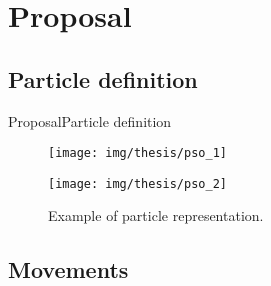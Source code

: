 \documentclass[10pt]{beamer}
\newcommand{\1}{
        	\setbeamertemplate{background}{
        		\texttt{[image: img/1]}
        		\tikz[overlay] \fill[fill opacity=0.75,fill=white] (0,0) rectangle (-\paperwidth,\paperheight);
        	}
}
\begin{document}
\section{Proposal}


\subsection{Particle definition}

\begin{frame}{Proposal}{Particle definition}
	\begin{figure}[h]
		\centering
		\begin{multicols}{2}
			\texttt{[image: img/thesis/pso\_1]}\par 
			\texttt{[image: img/thesis/pso\_2]}\par 
		\end{multicols}
		\caption{Example of particle representation.}
		\label{fig:s8_align}
	\end{figure}
\end{frame}

\subsection{Movements}
\end{document}
